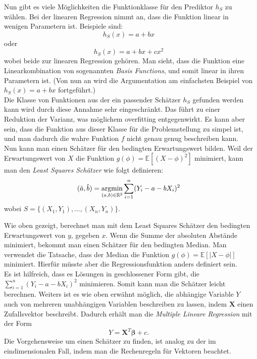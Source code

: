 Nun gibt es viele M\"oglichkeiten die Funktionklasse f\"ur den Prediktor $h_S$ zu w\"ahlen. Bei der linearen
Regression nimmt an, dass die Funktion linear in wenigen Parametern ist. Beispiele sind:
$$ h_S(x) = a + bx $$ 
oder 
$$ h_S(x) = a + bx + cx^2$$
wobei beide zur linearen Regression geh\"oren. Man sieht, dass die Funktion eine Linearkombination von sogenannten \textit{Basis Functions}, und somit 
linear in ihren Parametern ist. (Von nun an wird die Argumentation am einfachsten Beispiel von $ h_S(x) = a + bx $ fortgef\"uhrt.)\\ 

Die Klasse von Funktionen aus der ein passender Sch\"atzer $h_S$ gefunden werden kann wird durch diese Annahme sehr eingeschr\"ankt. Das f\"uhrt zu einer
Reduktion der Varianz, was m\"oglichem overfitting entgegenwirkt. Es kann aber sein, dass die Funktion aus dieser Klasse f\"ur die Problemstellung zu simpel ist, und 
man dadurch die wahre Funktion $f$ nicht genau genug beschreiben kann. \\

Nun kann man einen Sch\"atzer f\"ur den bedingten Erwartungswert bilden.
Weil der Erwartungswert von $X$ die Funktion $g(\phi) = \mathbb{E}[(X - \phi)^2]$ minimiert, kann man den \textit{Least Squares Sch\"atzer} wie folgt definieren:
$$ (\hat{a}, \hat{b}) = \operatorname*{argmin}_{(a,b) \in \mathbb{R}^2} \sum_{i=1}^n (Y_i - a - bX_i)^2$$
wobei $S = \{(X_1, Y_1), \dots , (X_n,Y_n)\}$.

Wie oben gezeigt, berechnet man mit dem Least Squares Sch\"atzer den bedingten Erwartungswert von $y$, gegeben $x$. 
Wenn die Summe der absoluten Abst\"ande minimiert, bekommt man einen Sch\"atzer f\"ur den bedingten Median. Man verwendet die Tatsache, dass
der Median die Funktion $g(\phi) = \mathbb{E}[|X - \phi|]$ minimiert. Hierfür müsste aber die Regressionsfunktion anders definiert sein. \\ 

Es ist hilfreich, dass es L\"osungen in geschlossener Form gibt, die $\sum_{i=1}^n (Y_i - a - bX_i)^2 $ minimieren. Somit kann man die Sch\"atzer leicht berechnen.
Weiters ist es wie oben erw\"ahnt m\"oglich, die abh\"angige Variable $Y$ auch von mehreren unabh\"angigen Variablen beschreiben zu lassen, indem $\mathbf{X}$ einen Zufallsvektor beschreibt.
Dadurch erh\"alt man die \textit{Multiple Lineare Regression} 
mit der Form 
$$ Y = \mathbf{X}^T\mathbf{\beta} + c. $$
Die Vorgehensweise um einen Sch\"atzer zu finden, ist analog zu der im eindimensionalen Fall, indem man die Rechenregeln f\"ur Vektoren beachtet. \\ 

